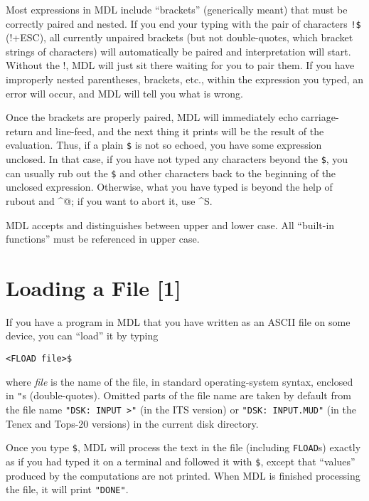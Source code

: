 \documentclass[a4paper]{scrbook}
\begin{document}
Most expressions in MDL include ``brackets'' (generically meant) that must be correctly paired and nested. If you end your
typing with the pair of characters \texttt{!\$}  (!+ESC), all currently unpaired brackets (but
not double-quotes, which bracket strings of characters) will automatically be paired and interpretation will start. Without
the !, MDL will just sit there waiting for you to pair them. If you have improperly nested parentheses, brackets, etc.,
within the expression you typed, an error will occur, and MDL will tell you what is wrong.

Once the brackets are properly paired, MDL will immediately echo carriage-return and line-feed, and the next thing it
prints will be the result of the evaluation. Thus, if a plain \texttt{\$} is not so echoed, you have some expression
unclosed. In that case, if you have not typed any characters beyond the \texttt{\$}, you can usually rub out the
\texttt{\$} and other characters back to the beginning of the unclosed expression. Otherwise, what you have typed is beyond
the help of rubout and \^{}@; if you want to abort it, use \^{}S.

MDL accepts and distinguishes between upper and lower case. All ``built-in functions'' must be referenced in upper case.

\section{Loading a File {[}1{]}}\label{loading-a-file-1}

If you have a program in MDL that you have written as an ASCII file on some device, you can ``load'' it by typing

\begin{verbatim}
<FLOAD file>$
\end{verbatim}

where \emph{file} is the name of the file, in standard operating-system syntax, enclosed in \texttt{"}s (double-quotes).
Omitted parts of the file name are taken by default from the file name \texttt{"DSK:\ INPUT\ \textgreater{}"} (in the ITS
version) or \texttt{"DSK:\ INPUT.MUD"} (in the Tenex and Tops-20 versions) in the current disk directory.

Once you type \texttt{\$}, MDL will process the text in the file (including \texttt{FLOAD}s) exactly as if you had typed it
on a terminal and followed it with \texttt{\$}, except that ``values'' produced by the computations are not printed. When
MDL is finished processing the file, it will print \texttt{"DONE"}.
\end{document}
